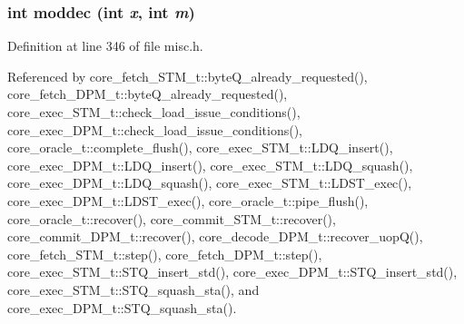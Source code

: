 \subsubsection[{moddec}]{\setlength{\rightskip}{0pt plus 5cm}int moddec (int {\em x}, \/  int {\em m})\hspace{0.3cm}{\tt  [inline]}}\label{misc_8h_e72918bfe3eb9d02e83975f2739a7ab2}




Definition at line 346 of file misc.h.

Referenced by core\_\-fetch\_\-STM\_\-t::byteQ\_\-already\_\-requested(), core\_\-fetch\_\-DPM\_\-t::byteQ\_\-already\_\-requested(), core\_\-exec\_\-STM\_\-t::check\_\-load\_\-issue\_\-conditions(), core\_\-exec\_\-DPM\_\-t::check\_\-load\_\-issue\_\-conditions(), core\_\-oracle\_\-t::complete\_\-flush(), core\_\-exec\_\-STM\_\-t::LDQ\_\-insert(), core\_\-exec\_\-DPM\_\-t::LDQ\_\-insert(), core\_\-exec\_\-STM\_\-t::LDQ\_\-squash(), core\_\-exec\_\-DPM\_\-t::LDQ\_\-squash(), core\_\-exec\_\-STM\_\-t::LDST\_\-exec(), core\_\-exec\_\-DPM\_\-t::LDST\_\-exec(), core\_\-oracle\_\-t::pipe\_\-flush(), core\_\-oracle\_\-t::recover(), core\_\-commit\_\-STM\_\-t::recover(), core\_\-commit\_\-DPM\_\-t::recover(), core\_\-decode\_\-DPM\_\-t::recover\_\-uopQ(), core\_\-fetch\_\-STM\_\-t::step(), core\_\-fetch\_\-DPM\_\-t::step(), core\_\-exec\_\-STM\_\-t::STQ\_\-insert\_\-std(), core\_\-exec\_\-DPM\_\-t::STQ\_\-insert\_\-std(), core\_\-exec\_\-STM\_\-t::STQ\_\-squash\_\-sta(), and core\_\-exec\_\-DPM\_\-t::STQ\_\-squash\_\-sta().

